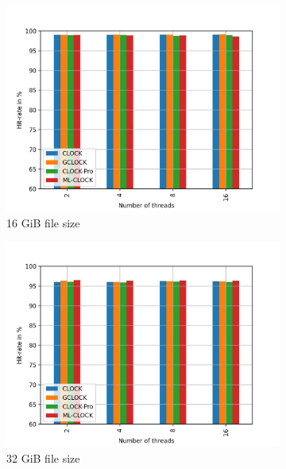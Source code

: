 \documentclass[
	12pt,
	a4paper,
	abstract,
	bibliography=totoc,
	chapterprefix,
	headings=openright,
	numbers=endperiod,
	parskip=half,
	twoside,
]{scrreprt}
\begin{document}
\begin{figure}[H]
	\centering
	\begin{subfigure}{0.4\textwidth}
		\includegraphics[width=\textwidth]{multi_16_gb_rw_90to10_zoned.jpg}		
		\caption{16 GiB file size}
		\label{fig:rw_90to10  zipf}
	\end{subfigure}
	\hfill
	\begin{subfigure}{0.4\textwidth}
		\includegraphics[width=\textwidth]{multi_32_gb_rw_90to10_zoned.jpg}		
		\caption{32 GiB file size}
		\label{fig:rw_90to10  normal}
	\end{subfigure}
	\hfill
	\begin{subfigure}{0.4\textwidth}

\end{subfigure}
\end{figure}
\end{document}
